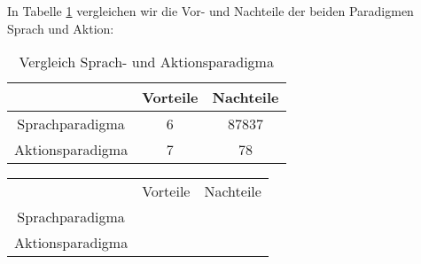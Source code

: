 In Tabelle \ref{table:1} vergleichen wir die Vor- und Nachteile der beiden Paradigmen Sprach und Aktion:
\begin{table}[h!]
\centering
\begin{tabular}{||c c c||} 
 \hline
 & Vorteile & Nachteile \\ [0.5ex] 
 \hline\hline
 Sprachparadigma & 6 & 87837  \\ 
 Aktionsparadigma & 7 & 78  \\
 \hline
\end{tabular}
\caption{Vergleich Sprach- und Aktionsparadigma}
\label{table:1}
\end{table}

\begin{center}
  \begin{tabular}{ c c c }
     & Vorteile & Nachteile \\ 
     Sprachparadigma & & \\  
     Aktionsparadigma & & 
  \end{tabular}
\end{center}

